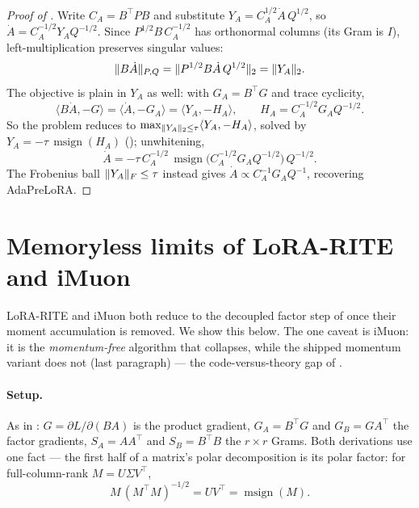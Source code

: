 \documentclass[11pt]{article}
\DeclarePairedDelimiter{\norm}{\lVert}{\rVert}
\DeclareMathOperator{\polar}{msign}          %
\theoremstyle{plain}
\theoremstyle{definition}
\theoremstyle{remark}
\begin{document}
\begin{proof}[Proof of ]
Write $C_A=B^\top P B$ and substitute $Y_A=C_A^{1/2}\dot A\,Q^{1/2}$, so $\dot A=C_A^{-1/2}Y_A Q^{-1/2}$. Since $P^{1/2}B\,C_A^{-1/2}$ has orthonormal columns (its Gram is $I$), left-multiplication preserves singular values:
\[
  \norm{B\dot A}_{P,Q}=\norm{P^{1/2}B\dot A\,Q^{1/2}}_2=\norm{Y_A}_2 .
\]
The objective is plain in $Y_A$ as well: with $G_A=B^\top G$ and trace cyclicity,
\[
  \langle B\dot A,-G\rangle=\langle\dot A,-G_A\rangle=\langle Y_A,-H_A\rangle,\qquad H_A=C_A^{-1/2}G_A Q^{-1/2}.
\]
So the problem reduces to $\max_{\norm{Y_A}_2\le\tau}\langle Y_A,-H_A\rangle$, solved by $Y_A=-\tau\,\polar(H_A)$ (); unwhitening,
\[
  \dot A=-\tau\,C_A^{-1/2}\,\polar\!\big(C_A^{-1/2}G_A Q^{-1/2}\big)\,Q^{-1/2}.
\]
The Frobenius ball $\norm{Y_A}_F\le\tau$ instead gives $\dot A\propto C_A^{-1}G_A Q^{-1}$, recovering AdaPreLoRA.
\end{proof}

\section{Memoryless limits of LoRA-RITE and iMuon}
\label{app:memoryless}
LoRA-RITE \cite{lorarite} and iMuon \cite{imuon} both reduce to the decoupled factor step of
 once their moment accumulation is removed. We show this below. The one
caveat is iMuon: it is the \emph{momentum-free} algorithm that collapses, while the shipped
momentum variant does not (last paragraph) --- the code-versus-theory gap of
.

\paragraph{Setup.} As in : $G=\partial L/\partial(BA)$ is the product
gradient, $G_A=B^\top G$ and $G_B=GA^\top$ the factor gradients, $S_A=AA^\top$ and
$S_B=B^\top B$ the $r\times r$ Grams. Both derivations use one fact --- the first half of a
matrix's polar decomposition is its polar factor: for full-column-rank $M=U\Sigma V^\top$,
\begin{equation}
  M\,(M^\top M)^{-1/2}=UV^\top=\polar(M).
  \label{eq:polar-id}
\end{equation}
\end{document}
